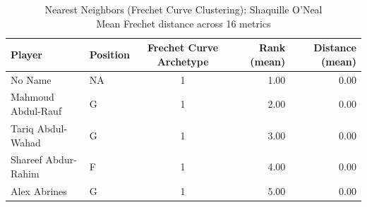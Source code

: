 \begin{table}[t]
\caption*{
{\fontsize{20}{25} Nearest Neighbors (Frechet Curve Clustering): Shaquille O'Neal\fontsize{12}{15}\selectfont } \\ 
{\fontsize{14}{17}\selectfont  Mean Frechet distance across 16 metrics\fontsize{12}{15}\selectfont }
} 
\fontsize{12.0pt}{14.0pt}\selectfont
\begin{tabular*}{\linewidth}{@{\extracolsep{\fill}}llcrr}
\toprule
Player & Position & Frechet Curve Archetype & Rank (mean) & Distance (mean) \\ 
\midrule\addlinespace[2.5pt]
No Name & NA & 1 & 1.00 & 0.00 \\ 
Mahmoud Abdul-Rauf & G & 1 & 2.00 & 0.00 \\ 
Tariq Abdul-Wahad & G & 1 & 3.00 & 0.00 \\ 
Shareef Abdur-Rahim & F & 1 & 4.00 & 0.00 \\ 
Alex Abrines & G & 1 & 5.00 & 0.00 \\ 
\bottomrule
\end{tabular*}
\end{table}

